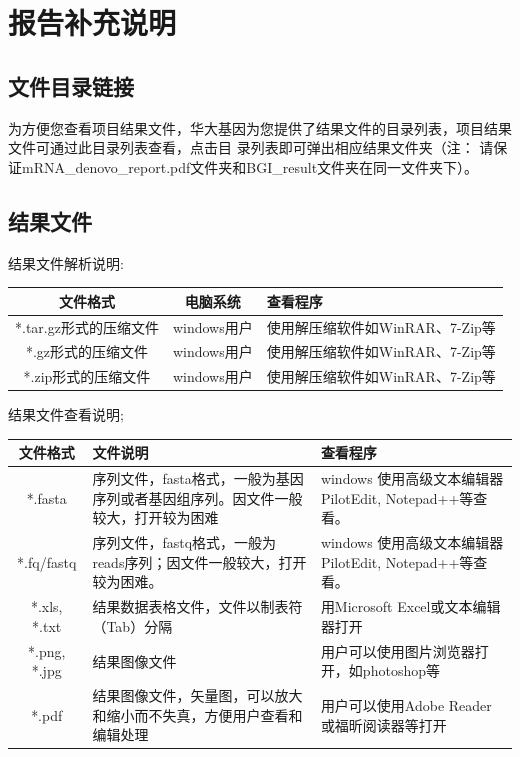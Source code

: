 \documentclass[10pt, oneside,a4paper]{article}
\begin{document}
\newpage
\section{报告补充说明}
\subsection{文件目录链接}
为方便您查看项目结果文件，华大基因为您提供了结果文件的目录列表，项目结果文件可通过此目录列表查看，点击目
录列表即可弹出相应结果文件夹（注： 请保证mRNA\_denovo\_report.pdf文件夹和BGI\_result文件夹在同一文件夹下）。
\subsection{结果文件}
结果文件解析说明:\par
\vspace{2 mm}
\begin{center}
\begin{tabularx}{130mm}{ccX}
\hline
\textbf{文件格式} & \textbf{电脑系统} & \textbf{查看程序} \\
\hline
*.tar.gz形式的压缩文件 & windows用户 & 使用解压缩软件如WinRAR、7-Zip等 \\
*.gz形式的压缩文件 & windows用户 & 使用解压缩软件如WinRAR、7-Zip等 \\
*.zip形式的压缩文件 & windows用户 & 使用解压缩软件如WinRAR、7-Zip等 \\
\hline
\end{tabularx}
\end{center}
\vspace{5 mm}
\par
结果文件查看说明;\par
\vspace{2 mm}
\begin{center}
\begin{tabularx}{160mm}{cXX}
\hline
\textbf{文件格式} & \textbf{文件说明} & \textbf{查看程序} \\
\hline
*.fasta & 序列文件，fasta格式，一般为基因序列或者基因组序列。因文件一般较大，打开较为困难 & windows 使用高级文本编辑器 PilotEdit, Notepad++等查看。 \\
*.fq/fastq & 序列文件，fastq格式，一般为reads序列；因文件一般较大，打开较为困难。 & windows 使用高级文本编辑器 PilotEdit, Notepad++等查看。 \\
*.xls, *.txt & 结果数据表格文件，文件以制表符（Tab）分隔 & 用Microsoft Excel或文本编辑器打开 \\
*.png, *.jpg & 结果图像文件 & 用户可以使用图片浏览器打开，如photoshop等 \\
*.pdf & 结果图像文件，矢量图，可以放大和缩小而不失真，方便用户查看和编辑处理 & 用户可以使用Adobe Reader或福昕阅读器等打开 \\
\hline
\end{tabularx}
\end{center}
\end{document}
